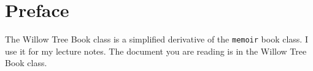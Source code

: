 \documentclass{willowtreebook}
\begin{document}
\chapter{Preface}
The Willow Tree Book class is a simplified derivative of the \verb!memoir! book class.
I use it for my lecture notes.
The document you are reading is in the Willow Tree Book class.

\afterpreface

%
%
%

\end{document}
